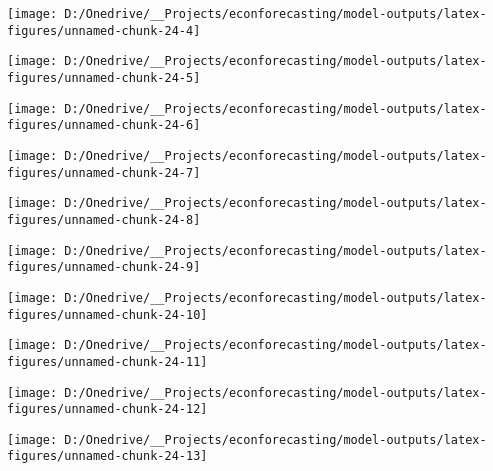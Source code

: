 \documentclass[11pt, letterpaper]{article}\usepackage[]{graphicx}\usepackage[]{color}
\begin{document}
{\centering \texttt{[image: D:/Onedrive/\_\_Projects/econforecasting/model-outputs/latex-figures/unnamed-chunk-24-4]} 

}




{\centering \texttt{[image: D:/Onedrive/\_\_Projects/econforecasting/model-outputs/latex-figures/unnamed-chunk-24-5]} 

}




{\centering \texttt{[image: D:/Onedrive/\_\_Projects/econforecasting/model-outputs/latex-figures/unnamed-chunk-24-6]} 

}




{\centering \texttt{[image: D:/Onedrive/\_\_Projects/econforecasting/model-outputs/latex-figures/unnamed-chunk-24-7]} 

}




{\centering \texttt{[image: D:/Onedrive/\_\_Projects/econforecasting/model-outputs/latex-figures/unnamed-chunk-24-8]} 

}




{\centering \texttt{[image: D:/Onedrive/\_\_Projects/econforecasting/model-outputs/latex-figures/unnamed-chunk-24-9]} 

}




{\centering \texttt{[image: D:/Onedrive/\_\_Projects/econforecasting/model-outputs/latex-figures/unnamed-chunk-24-10]} 

}




{\centering \texttt{[image: D:/Onedrive/\_\_Projects/econforecasting/model-outputs/latex-figures/unnamed-chunk-24-11]} 

}




{\centering \texttt{[image: D:/Onedrive/\_\_Projects/econforecasting/model-outputs/latex-figures/unnamed-chunk-24-12]} 

}




{\centering \texttt{[image: D:/Onedrive/\_\_Projects/econforecasting/model-outputs/latex-figures/unnamed-chunk-24-13]} 

}
\end{document}
